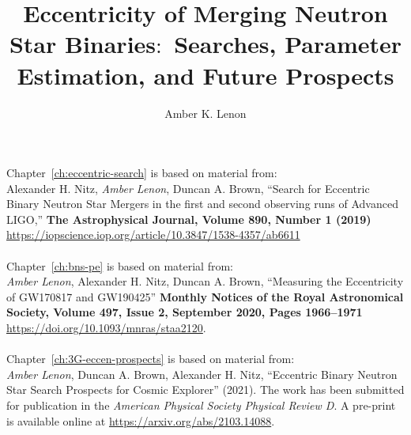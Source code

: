\documentclass[12pt,notitlepage]{report}
\begin{document}

\title{Eccentricity of Merging Neutron Star Binaries$:$ Searches, Parameter Estimation, and Future Prospects }
\author{Amber K. Lenon}
\clearpage

\havededicationtrue
\dedication{To Mom, Collin, \& Jace}
\haveminorfalse
{}
\copyrighttrue
\doctoratetrue
\figurespagetrue
\tablespagetrue
\electronicsubmittrue
\Acknowledgments{
}
\beforepreface
{}
Chapter~\ref{ch:eccentric-search} is based on material from: \\
Alexander H. Nitz, \textit{Amber Lenon}, Duncan A. Brown, ``Search for Eccentric Binary Neutron Star Mergers in the first and second observing runs of Advanced LIGO,'' \textbf{ The Astrophysical Journal, Volume 890, Number 1 (2019)} \\ \url{https://iopscience.iop.org/article/10.3847/1538-4357/ab6611}
\\ \\
Chapter~\ref{ch:bns-pe} is based on material from:  \\ 
\textit{Amber Lenon}, Alexander H. Nitz, Duncan A. Brown, ``Measuring the Eccentricity of GW170817 and GW190425'' \textbf{Monthly Notices of the Royal Astronomical Society, Volume 497, Issue 2, September 2020, Pages 1966–1971} \\  \url{https://doi.org/10.1093/mnras/staa2120}.
\\ \\
Chapter~\ref{ch:3G-eccen-prospects} is based on material from:  \\ 
\textit{Amber Lenon}, Duncan A. Brown, Alexander H. Nitz,  ``Eccentric Binary Neutron Star Search Prospects for Cosmic Explorer'' (2021).  The work has been submitted for publication in the \textit{American Physical Society Physical Review D}. A pre-print is available online at \url{https://arxiv.org/abs/2103.14088}.
\\ \\
\end{document}
